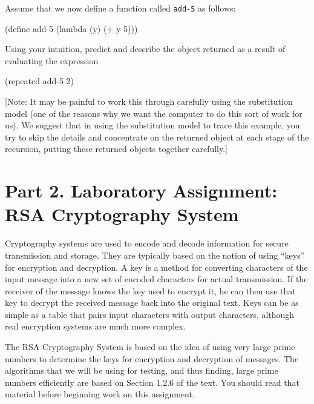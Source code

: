 \begin{itemize}
      Assume that we now define a function called {\tt add-5} as follows:

\beginlisp
      (define add-5 (lambda (y) (+ y 5)))
\endlisp

      Using your intuition, predict and describe the object returned
      as a result of evaluating the expression

\beginlisp
      (repeated add-5 2)
\endlisp

[Note: It may be painful to work this through carefully using the
substitution model (one of the reasons why we want the computer to do
this sort of work for us).  We suggest that in using the substitution
model to trace this example, you try to skip the details and
concentrate on the returned object at each stage of the recursion,
putting these returned objects together carefully.]

\end{itemize}

\section{Part 2. Laboratory Assignment: RSA Cryptography System}



Cryptography systems are used to encode and decode information for
secure transmission and storage.  They are typically based on the
notion of using ``keys'' for encryption and decryption.  A key is a method
for converting characters of the input message into a new set of
encoded characters for actual transmission.  If the receiver of the
message knows the key used to encrypt it, he can then use that key to
decrypt the received message back into the original text.  Keys can be
as simple as a table that pairs input characters with output
characters, although real encryption systems are much more complex.

The RSA Cryptography System is based on the idea of using very large
prime numbers to determine the keys for encryption and decryption of
messages.  The algorithms that we will be using for testing, and thus
finding, large prime numbers efficiently are based on Section 1.2.6 of
the text.  You should read that material before beginning work on this
assignment.

